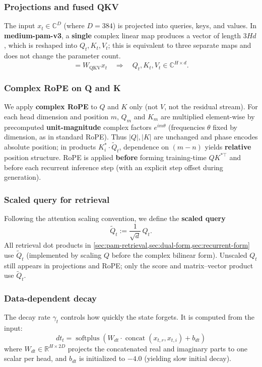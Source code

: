 \documentclass[11pt]{article}
\newcommand{\Complex}{\mathbb{C}}
\newcommand{\concat}{\operatorname{concat}}
\begin{document}
\subsubsection{Projections and fused QKV}
The input $x_t \in \Complex^D$ (where $D = 384$) is projected into queries, keys, and values. In \textbf{medium-pam-v3}, a \textbf{single} complex linear map produces a vector of length $3Hd$, which is reshaped into $Q_t, K_t, V_t$; this is equivalent to three separate maps and does not change the parameter count.
\begin{equation}
  [Q_t; K_t; V_t] = W_{\text{QKV}} x_t \quad \Rightarrow \quad Q_t, K_t, V_t \in \Complex^{H \times d} .
\end{equation}

\subsubsection{Complex RoPE on Q and K}
\label{sec:pam-rope}
We apply \textbf{complex RoPE} to $Q$ and $K$ only (not $V$, not the residual stream). For each head dimension and position $m$, $Q_{m}$ and $K_{m}$ are multiplied element-wise by precomputed \textbf{unit-magnitude} complex factors $e^{i m \theta}$ (frequencies $\theta$ fixed by dimension, as in standard RoPE). Thus $|Q|, |K|$ are unchanged and phase encodes absolute position; in products $K_i^* \cdot \tilde{Q}_t$, dependence on $(m{-}n)$ yields \textbf{relative} position structure. RoPE is applied \textbf{before} forming training-time $Q K^{*\top}$ and before each recurrent inference step (with an explicit step offset during generation).

\subsubsection{Scaled query for retrieval}
\label{sec:scaled-query}
Following the attention scaling convention, we define the \textbf{scaled query}
\begin{equation}
  \tilde{Q}_t := \frac{1}{\sqrt{d}}\, Q_t .
\end{equation}
All retrieval dot products in \cref{sec:pam-retrieval,sec:dual-form,sec:recurrent-form} use $\tilde{Q}_t$ (implemented by scaling $Q$ before the complex bilinear form). Unscaled $Q_t$ still appears in projections and RoPE; only the score and matrix--vector product use $\tilde{Q}_t$.

\subsubsection{Data-dependent decay}
The decay rate $\gamma_t$ controls how quickly the state forgets. It is computed from the input:
\begin{equation}
  dt_t = \operatorname{softplus}(W_{dt} \cdot \concat(x_{t,r}, x_{t,i}) + b_{dt})
\end{equation}
where $W_{dt} \in \mathbb{R}^{H \times 2D}$ projects the concatenated real and imaginary parts to one scalar per head, and $b_{dt}$ is initialized to $-4.0$ (yielding slow initial decay).
\end{document}
